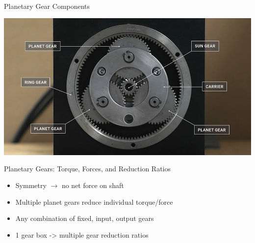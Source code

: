 \documentclass[10pt, svgnames]{beamer}
\begin{document}
\begin{frame}[label={sec:org7f4592e}]{Planetary Gear Components}
\begin{center}
\includegraphics[width=.9\linewidth]{pictures/planetary-gear-comp.jpg}
\end{center}
\end{frame}

\begin{frame}[label={sec:orgcc2c4ea}]{Planetary Gears: Torque, Forces, and Reduction Ratios}
\begin{itemize}
\item Symmetry \(\rightarrow\) no net force on shaft

\item Multiple planet gears reduce individual torque/force

\item Any combination of fixed, input, output gears

\item 1 gear box -> multiple gear reduction ratios
\end{itemize}
\end{frame}
\end{document}
